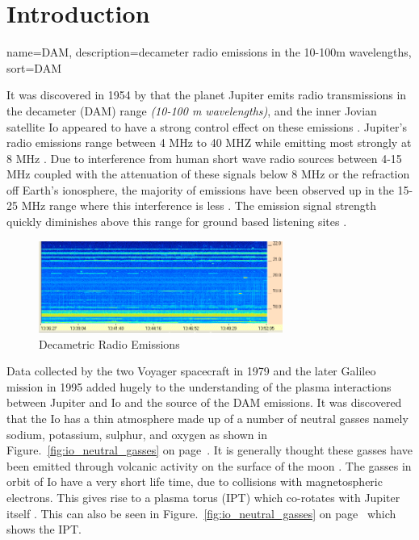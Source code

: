 \newpage
\chapter*{Introduction}

%
{
  name={DAM},
  description={decameter radio emissions in the 10-100m wavelengths},
  sort=DAM
}
%

It was discovered in 1954 by \cite{burke55} that the planet Jupiter emits radio transmissions in the decameter (\gls{DAM}) range \textit{(10-100 m wavelengths)}, and the inner Jovian satellite Io appeared to have a strong control effect on these emissions \citep{belcher87}. Jupiter's radio emissions range between 4 MHz to 40 MHZ while emitting most strongly at 8 MHz  \citep{wilkinson94}. Due to interference from human short wave radio sources between 4-15 MHz coupled with the attenuation of these signals below 8 MHz or the refraction off Earth's ionosphere, the majority of emissions have been observed up in the 15-25 MHz range where this interference is less \citep{wilkinson94}. The emission signal strength quickly diminishes above this range for ground based listening sites \citep{wilkinson94}.

%
\begin{figure}[here]
\centering
\includegraphics[width=8cm]{images/01}
\caption{Decametric Radio Emissions \citep{ashcraft13}}
\label{fig:dam_Emissions}
\end{figure}
%

Data collected by the two Voyager spacecraft in 1979 \citep{belcher87} and the later Galileo mission in 1995 \citep{kivelson96} added hugely to the understanding of the plasma interactions between Jupiter and Io and the source of the \gls{DAM} emissions. It was discovered that the Io has a thin atmosphere made up of a number of neutral gasses namely sodium, potassium, sulphur, and oxygen as shown in Figure.~\ref{fig:io_neutral_gasses} on page~\pageref{fig:io_neutral_gasses}. It is generally thought these gasses have been emitted through volcanic activity on the surface of the moon \citep{belcher87}. The gasses in orbit of Io have a very short life time, due to collisions with magnetospheric electrons. This gives rise to a plasma torus (\gls{IPT}) which co-rotates with Jupiter itself \citep{belcher87}. This can also be seen in Figure.~\ref{fig:io_neutral_gasses} on page~\pageref{fig:io_neutral_gasses} which shows the \gls{IPT}.

